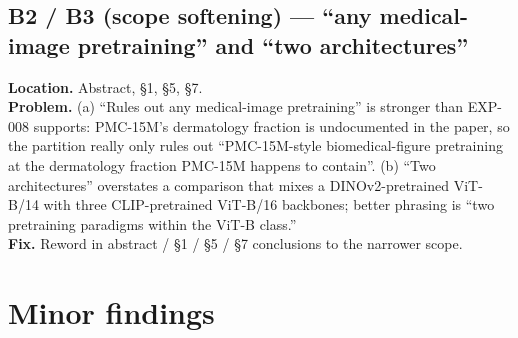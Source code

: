 \documentclass[11pt,a4paper]{article}
\begin{document}
\subsection*{B2 / B3 (scope softening) --- ``any medical-image
            pretraining'' and ``two architectures''}

\textbf{Location.} Abstract, \S1, \S5, \S7.\\
\textbf{Problem.} (a) ``Rules out any medical-image pretraining'' is
stronger than EXP-008 supports: PMC-15M's dermatology fraction is
undocumented in the paper, so the partition really only rules out
``PMC-15M-style biomedical-figure pretraining at the dermatology
fraction PMC-15M happens to contain''. (b) ``Two architectures''
overstates a comparison that mixes a DINOv2-pretrained ViT-B/14 with
three CLIP-pretrained ViT-B/16 backbones; better phrasing is ``two
pretraining paradigms within the ViT-B class.''\\
\textbf{Fix.} Reword in abstract / \S1 / \S5 / \S7 conclusions to the
narrower scope.

\section{Minor findings}
\end{document}
